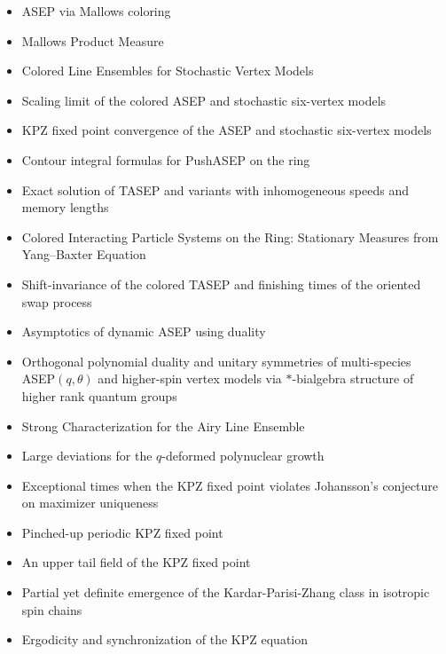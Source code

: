 \documentclass[10pt]{article}
\numberwithin{equation}{section}
\theoremstyle{plain}
\theoremstyle{plain}
\theoremstyle{definition}
\begin{document}
\begin{itemize}
	\item \cite{borodin2024asep} {ASEP via Mallows coloring}
	\item \cite{bufetov2024mallows} {Mallows Product Measure}
	\item \cite{aggarwal2024colored} {Colored Line Ensembles for Stochastic Vertex Models}
	\item \cite{aggarwal_corwin_hegde2024scaling} {Scaling limit of the colored ASEP and stochastic six-vertex models}
	\item \cite{aggarwal2024kpz} {KPZ fixed point convergence of the ASEP and stochastic six-vertex models}
	\item \cite{li2023contour} {Contour integral formulas for PushASEP on the ring}
	\item \cite{matetski2023exact} {Exact solution of TASEP and variants with inhomogeneous speeds and memory lengths}
	\item \cite{AggarwalNicolettiPetrov2023colored} {Colored Interacting Particle Systems on the Ring: Stationary Measures from Yang--Baxter Equation}
	\item \cite{Zhang2023} {Shift-invariance of the colored TASEP and finishing times of the oriented swap process}
	\item \cite{Kuan2024} {Asymptotics of dynamic ASEP using duality}
	\item \cite{Franceschini2024} {Orthogonal polynomial duality and unitary symmetries of multi-species ASEP$(q,\theta)$ and higher-spin vertex models via $*$-bialgebra structure of higher rank quantum groups}
	\item \cite{AggarwalHuang2023Characterization} {Strong Characterization for the Airy Line Ensemble}
	\item \cite{das2023large} {Large deviations for the $q$-deformed polynuclear growth}
	\item \cite{corwin2023exceptional} {Exceptional times when the KPZ fixed point violates Johansson's conjecture on maximizer uniqueness}
	\item \cite{baik2024pinchedup} {Pinched-up periodic KPZ fixed point}
	\item \cite{liu2025upper} {An upper tail field of the KPZ fixed point}
	\item \cite{takeuchi2024partial} {Partial yet definite emergence of the Kardar-Parisi-Zhang class in isotropic spin chains}
	\item \cite{Janjigian2022} {Ergodicity and synchronization of the KPZ equation}

\end{itemize}
\end{document}
